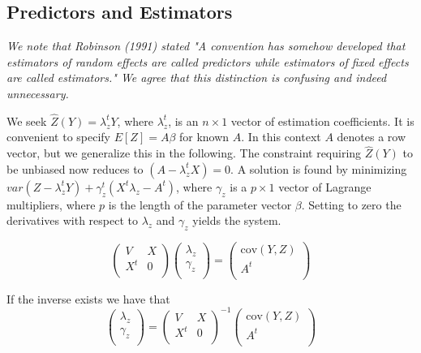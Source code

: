 \documentclass[12pt, a4paper]{report}
\begin{document}

\subsection{Predictors and Estimators}

\emph{We note that Robinson (1991) stated "A convention has somehow developed that estimators of random effects are called predictors while estimators of fixed effects are called estimators." We agree that this distinction is confusing and indeed unnecessary.} \\ \bigskip



We seek $\hat{Z}(Y) = \lambda_{z}^{t}Y$, where $ \lambda_{z}^{t}$, is an $n \times 1$ vector of estimation coefficients. It is convenient to specify $E[Z]=A\beta$ for known $A$. In this context $A$ denotes a row vector, but we generalize this in the following. The constraint requiring $\hat{Z}(Y)$ to be unbiased now reduces to $(A -  \lambda_{z}^{t}X) = 0$. A solution is found by minimizing $var(Z -  \lambda_{z}^{t}Y) + \gamma^t_z (X^t\lambda_{z} - A^t)$, where $\gamma_z$ is a $p \times 1$ vector of Lagrange multipliers, where $p$ is the length of the parameter vector $\beta$. Setting to zero the derivatives with respect to $\lambda_{z}$ and $\gamma_z $ yields the system.




\begin{equation}
\left(
\begin{array}{cc}
V & X \\
X^t & 0 \\
\end{array}
\right)\left(
\begin{array}{c}
\lambda_{z}\\
\gamma_z \\
\end{array}
\right)=\left(
\begin{array}{c}
\mbox{cov}(Y,Z)\\
A^{t} \\
\end{array}
\right)
\end{equation}


If the inverse exists we have that
\begin{equation}
\left(
\begin{array}{c}
\lambda_{z}\\
\gamma_z \\
\end{array}
\right)=\left(
\begin{array}{cc}
V & X \\
X^t & 0 \\
\end{array}
\right) ^{-1}\left(
\begin{array}{c}
\mbox{cov}(Y,Z)\\
A^{t} \\
\end{array}
\right)
\end{equation}
\end{document}
